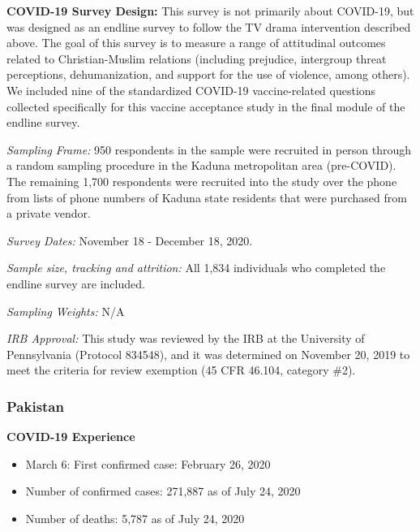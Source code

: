 \documentclass[
  12pt,
]{article}
\begin{document}
\textbf{COVID-19 Survey Design:} This survey is not primarily about COVID-19, but was designed as an endline survey to follow the TV drama intervention described above. The goal of this survey is to measure a range of attitudinal outcomes related to Christian-Muslim relations (including prejudice, intergroup threat perceptions, dehumanization, and support for the use of violence, among others). We included nine of the standardized COVID-19 vaccine-related questions collected specifically for this vaccine acceptance study in the final module of the endline survey.

\emph{Sampling Frame:} 950 respondents in the sample were recruited in person through a random sampling procedure in the Kaduna metropolitan area (pre-COVID). The remaining 1,700 respondents were recruited into the study over the phone from lists of phone numbers of Kaduna state residents that were purchased from a private vendor.

\emph{Survey Dates:} November 18 - December 18, 2020.

\emph{Sample size, tracking and attrition:} All 1,834 individuals who completed the endline survey are included.

\emph{Sampling Weights:} N/A

\emph{IRB Approval:} This study was reviewed by the IRB at the University of Pennsylvania (Protocol 834548), and it was determined on November 20, 2019 to meet the criteria for review exemption (45 CFR 46.104, category \#2).

\hypertarget{pakistan}{%
\subsubsection*{Pakistan}\label{pakistan}}

\textbf{COVID-19 Experience}

\begin{itemize}
\item March 6: First confirmed case: February  26, 2020 
\item Number of confirmed cases:  271,887 as of July 24, 2020 
\item Number of deaths:  5,787 as of July 24, 2020 
\end{itemize}
\end{document}
